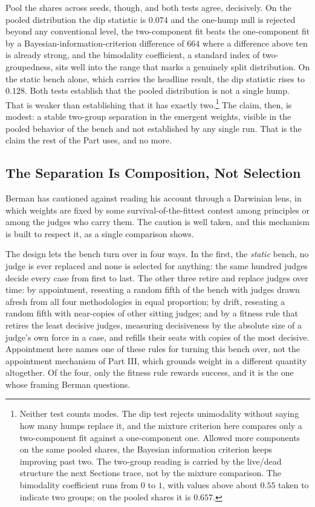 Pool the shares across seeds, though, and both tests agree, decisively. On
the pooled distribution the dip statistic is $0.074$ and the one-hump null
is rejected beyond any conventional level, the two-component fit beats the
one-component fit by a Bayesian-information-criterion difference of $664$
where a difference above ten is already strong, and the bimodality
coefficient, a standard index of two-groupedness, sits well into the range
that marks a genuinely split distribution. On the static bench alone, which
carries the headline result, the dip statistic rises to $0.128$. Both tests
establish that the pooled distribution is not a single hump. That is weaker
than establishing that it has exactly two.\footnote{Neither test counts
modes. The dip test rejects unimodality without saying how many humps replace
it, and the mixture criterion here compares only a two-component fit against a
one-component one. Allowed more components on the same pooled shares, the
Bayesian information criterion keeps improving past two. The two-group reading
is carried by the live/dead structure the next Sections trace, not by the
mixture comparison. The bimodality coefficient runs from $0$ to $1$, with
values above about $0.55$ taken to indicate two groups; on the pooled shares
it is $0.657$.} The claim, then, is modest: a stable two-group separation in the emergent
weights, visible in the pooled behavior of the bench and not established by
any single run. That is the claim the rest of the Part uses, and no more.

\subsection{The Separation Is Composition, Not Selection}

Berman has cautioned against reading his account through a Darwinian
lens, in which weights are fixed by some survival-of-the-fittest contest
among principles or among the judges who carry them. The caution is well
taken, and this mechanism is built to respect it, as a single comparison
shows.

The design lets the bench turn over in four ways. In
the first, the \textit{static} bench, no judge is ever replaced and none
is selected for anything: the same hundred judges decide every case from
first to last. The other three retire and replace judges over time: by appointment, reseating
a random fifth of the bench with judges drawn afresh from all four
methodologies in equal proportion; by drift, reseating a random fifth with
near-copies of other sitting judges; and by a fitness rule that retires the
least decisive judges, measuring decisiveness by the absolute size of a judge's
own force in a case, and refills their seats with copies of the most decisive.
Appointment here names one of these rules for turning this bench over, not the
appointment mechanism of Part III, which grounds weight in a different
quantity altogether. Of the four, only the fitness rule rewards success, and
it is the one whose framing Berman questions.

